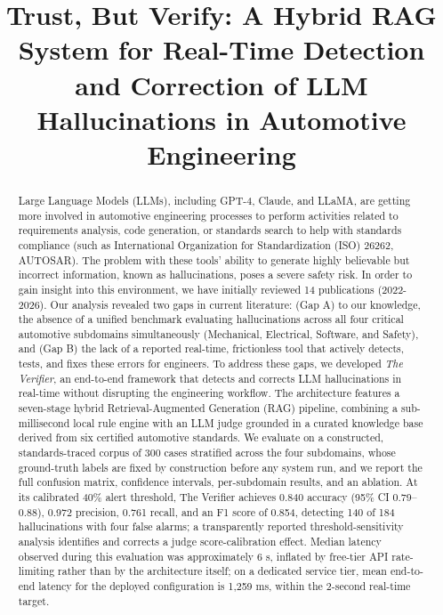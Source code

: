 \documentclass[conference,a4paper]{IEEEtran}
\begin{document}
\title{Trust, But Verify: A Hybrid RAG System for Real-Time Detection and Correction of LLM Hallucinations in Automotive Engineering}
\author{
\and
{}
}
\maketitle
\begin{abstract}
Large Language Models (LLMs), including GPT-4, Claude, and LLaMA, are getting more involved in automotive engineering processes to perform activities related to requirements analysis, code generation, or standards search to help with standards compliance (such as International Organization for Standardization (ISO) 26262, AUTOSAR). The problem with these tools' ability to generate highly believable but incorrect information, known as hallucinations, poses a severe safety risk. In order to gain insight into this environment, we have initially reviewed 14 publications (2022-2026). Our analysis revealed two gaps in current literature: (Gap A) to our knowledge, the absence of a unified benchmark evaluating hallucinations across all four critical automotive subdomains simultaneously (Mechanical, Electrical, Software, and Safety), and (Gap B) the lack of a reported real-time, frictionless tool that actively detects, tests, and fixes these errors for engineers.
To address these gaps, we developed \textit{The Verifier}, an end-to-end framework that detects and corrects LLM hallucinations in real-time without disrupting the engineering workflow. The architecture features a seven-stage hybrid Retrieval-Augmented Generation (RAG) pipeline, combining a sub-millisecond local rule engine with an LLM judge grounded in a curated knowledge base derived from six certified automotive standards. We evaluate on a constructed, standards-traced corpus of 300 cases stratified across the four subdomains, whose ground-truth labels are fixed by construction before any system run, and we report the full confusion matrix, confidence intervals, per-subdomain results, and an ablation. At its calibrated 40\% alert threshold, The Verifier achieves 0.840 accuracy (95\% CI 0.79--0.88), 0.972 precision, 0.761 recall, and an F1 score of 0.854, detecting 140 of 184 hallucinations with four false alarms; a transparently reported threshold-sensitivity analysis identifies and corrects a judge score-calibration effect. Median latency observed during this evaluation was approximately 6 s, inflated by free-tier API rate-limiting rather than by the architecture itself; on a dedicated service tier, mean end-to-end latency for the deployed configuration is 1{,}259 ms, within the 2-second real-time target.
\end{abstract}
\end{document}
